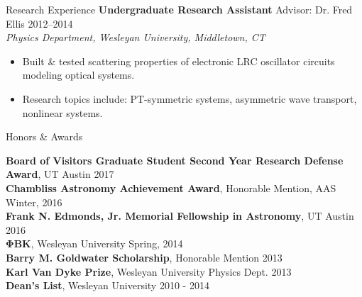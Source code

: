 \documentclass{resume} %
\begin{document}
\begin{rSection}{Research Experience}
{\bf Undergraduate Research Assistant} Advisor: Dr. Fred Ellis \hfill {2012--2014}\\{\em Physics Department, Wesleyan University, Middletown, CT}
    \vspace{-5pt}
    \begin{changemargin}{0in}{0.4in}
    \begin{itemize}
    \setlength\itemsep{-5pt}
\item Built \& tested scattering properties of electronic LRC oscillator circuits modeling optical systems.
\item Research topics include: PT-symmetric systems, asymmetric wave transport, nonlinear systems.
\end{itemize} 
    \end{changemargin}

\end{rSection} 


\begin{rSection}{Honors \& Awards}\itemsep -5pt

    {\bf Board of Visitors Graduate Student Second Year Research Defense Award}, UT Austin \hfill {2017}\\
    {\bf Chambliss Astronomy Achievement Award}, Honorable Mention, AAS \hfill {Winter, 2016}\\
    {\bf Frank N. Edmonds, Jr. Memorial Fellowship in Astronomy}, UT Austin \hfill {2016}\\
    {\bf $\mathbf{\Phi}$BK}, Wesleyan University \hfill {Spring, 2014}\\
    {\bf Barry M. Goldwater Scholarship}, Honorable Mention \hfill {2013}\\
    {\bf Karl Van Dyke Prize}, Wesleyan University Physics Dept. \hfill {2013}\\
    {\bf Dean's List}, Wesleyan University \hfill {2010 - 2014}%
\end{rSection}

\end{document}
